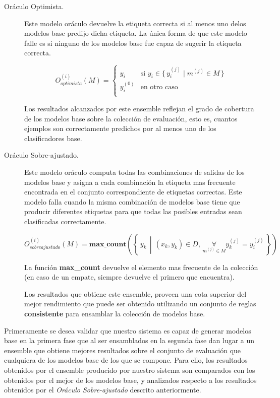 \begin{description}

\item[Oráculo Optimista.]
Este modelo oráculo devuelve la etiqueta correcta si al menos uno delos modelos base predijo dicha etiqueta.
La única forma de que este modelo falle es si ninguno de los modelos base fue capaz de sugerir la etiqueta correcta.

\begin{equation*}
O_{optimista}^{(i)}(M) =
    \begin{cases}
        y_i & \textrm{si $y_i \in \{\,y^{(j)}_i \mid m^{(j)} \in M \,\}$} \\
        y^{(0)}_i & \textrm{en otro caso} \\
    \end{cases}
\end{equation*}

Los resultados alcanzados por este ensemble reflejan el grado de cobertura de los modelos base sobre la colección de evaluación, esto es, cuantos ejemplos son correctamente predichos por al menos uno de los clasificadores base.

\item[Oráculo Sobre-ajustado.]
Este modelo oráculo computa todas las combinaciones de salidas de los modelos base y asigna a cada combinación la etiqueta mas frecuente encontrada en el conjunto correspondiente de etiquetas correctas.
Este modelo falla cuando la misma combinación de modelos base tiene que producir diferentes etiquetas para que todas las posibles entradas sean clasificadas correctamente.

\begin{equation*}
O_{sobreajustado}^{(i)}(M) =
    \textbf{max\_count}\left(\left\{\, y_k \,\middle\vert\, (x_k, y_k) \in D, \, \underset{m^{(j)} \in M}{\forall} y^{(j)}_k = y^{(j)}_i \,\right\}\right)
\end{equation*}

La función \textbf{max\_count} devuelve el elemento mas frecuente de la colección (en caso de un empate, siempre devuelve el primero que encuentra).

Los resultados que obtiene este ensemble, proveen una cota superior del mejor rendimiento que puede ser obtenido utilizando un conjunto de reglas \textbf{consistente} para ensamblar la colección de modelos base.

\end{description}

Primeramente se desea validar que nuestro sistema es capaz de generar modelos base en la primera fase que al ser ensamblados en la segunda fase dan lugar a un ensemble que obtiene mejores resultados sobre el conjunto de evaluación que cualquiera de los modelos base de los que se compone.
Para ello, los resultados obtenidos por el ensemble producido por nuestro sistema son comparados con los obtenidos por el mejor de los modelos base, y analizados respecto a los resultados obtenidos por el \emph{Oráculo Sobre-ajustado} descrito anteriormente.

